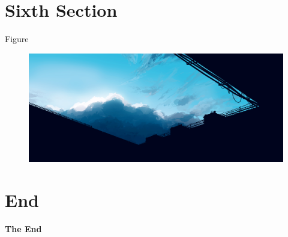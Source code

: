 \documentclass[aspectratio=169,xcolor=dvipsnames]{beamer}
\begin{document}
\section{Sixth Section}
\begin{frame}{Figure}
    \begin{figure}
        \includegraphics[width=0.8\linewidth]{background.jpg}
    \end{figure}
\end{frame}


\section{End}
\begin{frame}
    \Huge{\centerline{\textbf{The End}}}
\end{frame}
\end{document}
